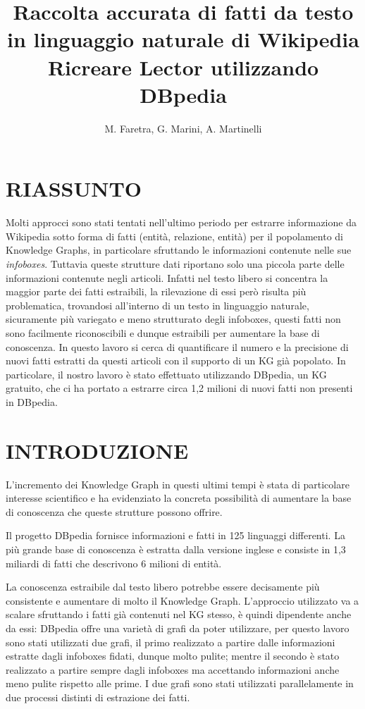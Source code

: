 \documentclass[10pt,a4paper,twocolumn]{article}
\author{M. Faretra, G. Marini, A. Martinelli}
\title{\textbf{Raccolta accurata di fatti da testo in linguaggio naturale di Wikipedia}\\Ricreare Lector utilizzando DBpedia}
\begin{document}
	
\maketitle
\pagestyle{empty}
		
\section*{RIASSUNTO}
		
Molti approcci sono stati tentati nell'ultimo periodo per estrarre informazione da Wikipedia sotto forma di fatti (entità, relazione, entità) per il popolamento di Knowledge Graphs, in particolare sfruttando le informazioni contenute nelle sue \textit{infoboxes}. Tuttavia queste strutture dati riportano solo una piccola parte delle informazioni contenute negli articoli. Infatti nel testo libero si concentra la maggior parte dei fatti estraibili, la rilevazione di essi però risulta più problematica, trovandosi all'interno di un testo in linguaggio naturale, sicuramente più variegato e meno strutturato degli infoboxes, questi fatti non sono facilmente riconoscibili e dunque estraibili per aumentare la base di conoscenza. In questo lavoro si cerca di quantificare il numero e la precisione di nuovi fatti estratti da questi articoli con il supporto di un KG già popolato. In particolare, il nostro lavoro è stato effettuato utilizzando DBpedia, un KG gratuito, che ci ha portato a estrarre circa 1,2 milioni di nuovi fatti non presenti in DBpedia.

\section{INTRODUZIONE} 

L'incremento dei Knowledge Graph in questi ultimi tempi è stata di particolare interesse scientifico e ha evidenziato la concreta possibilità di aumentare la base di conoscenza che queste strutture possono offrire.

Il progetto DBpedia fornisce informazioni e fatti in 125 linguaggi differenti. La più grande base di conoscenza è estratta dalla versione inglese e consiste in 1,3 miliardi di fatti che descrivono 6 milioni di entità. 

La conoscenza estraibile dal testo libero potrebbe essere decisamente più consistente e aumentare di molto il Knowledge Graph. L'approccio utilizzato va a scalare sfruttando i fatti già contenuti nel KG stesso, è quindi dipendente anche da essi: DBpedia offre una varietà di grafi da poter utilizzare, per questo lavoro sono stati utilizzati due grafi, il primo realizzato a partire dalle informazioni estratte dagli infoboxes fidati, dunque molto pulite; mentre il secondo è stato realizzato a partire sempre dagli infoboxes ma accettando informazioni anche meno pulite rispetto alle prime. I due grafi sono stati utilizzati parallelamente in due processi distinti di estrazione dei fatti.
\end{document}
